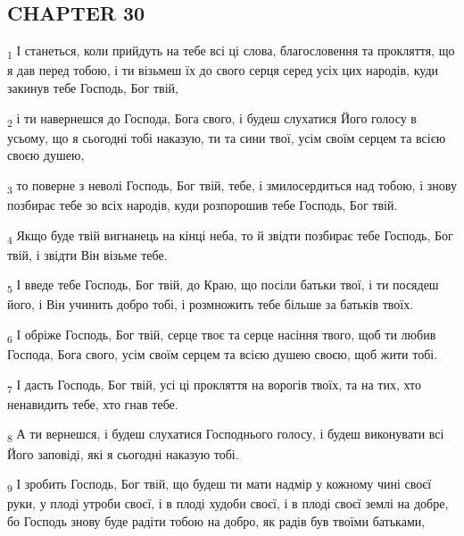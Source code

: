 \subsection{CHAPTER 30}
\begin{tcolorbox}
\textsubscript{1} І станеться, коли прийдуть на тебе всі ці слова, благословення та прокляття, що я дав перед тобою, і ти візьмеш їх до свого серця серед усіх цих народів, куди закинув тебе Господь, Бог твій,
\end{tcolorbox}
\begin{tcolorbox}
\textsubscript{2} і ти навернешся до Господа, Бога свого, і будеш слухатися Його голосу в усьому, що я сьогодні тобі наказую, ти та сини твої, усім своїм серцем та всією своєю душею,
\end{tcolorbox}
\begin{tcolorbox}
\textsubscript{3} то поверне з неволі Господь, Бог твій, тебе, і змилосердиться над тобою, і знову позбирає тебе зо всіх народів, куди розпорошив тебе Господь, Бог твій.
\end{tcolorbox}
\begin{tcolorbox}
\textsubscript{4} Якщо буде твій вигнанець на кінці неба, то й звідти позбирає тебе Господь, Бог твій, і звідти Він візьме тебе.
\end{tcolorbox}
\begin{tcolorbox}
\textsubscript{5} І введе тебе Господь, Бог твій, до Краю, що посіли батьки твої, і ти посядеш його, і Він учинить добро тобі, і розмножить тебе більше за батьків твоїх.
\end{tcolorbox}
\begin{tcolorbox}
\textsubscript{6} І обріже Господь, Бог твій, серце твоє та серце насіння твого, щоб ти любив Господа, Бога свого, усім своїм серцем та всією душею своєю, щоб жити тобі.
\end{tcolorbox}
\begin{tcolorbox}
\textsubscript{7} І дасть Господь, Бог твій, усі ці прокляття на ворогів твоїх, та на тих, хто ненавидить тебе, хто гнав тебе.
\end{tcolorbox}
\begin{tcolorbox}
\textsubscript{8} А ти вернешся, і будеш слухатися Господнього голосу, і будеш виконувати всі Його заповіді, які я сьогодні наказую тобі.
\end{tcolorbox}
\begin{tcolorbox}
\textsubscript{9} І зробить Господь, Бог твій, що будеш ти мати надмір у кожному чині своєї руки, у плоді утроби своєї, і в плоді худоби своєї, і в плоді своєї землі на добре, бо Господь знову буде радіти тобою на добро, як радів був твоїми батьками,
\end{tcolorbox}
